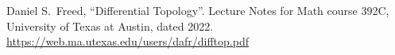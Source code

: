 \begin{thebibliography}{99}
  Daniel S.~Freed,
  ``Differential Topology''.
  Lecture Notes for Math course 392C, University of Texas at Austin, dated 2022.\newline
  \url{https://web.ma.utexas.edu/users/dafr/difftop.pdf}

\end{thebibliography}
